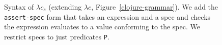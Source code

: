 \begin{figure}
\caption{Syntax of $\lambda c_s$ (extending $\lambda c$, Figure~\ref{clojure-grammar}).
  We add the \texttt{assert-spec} form that takes an expression and a spec
  and checks the expression evaluates to a value conforming to the spec.
  We restrict specs to just predicates \texttt{P}.}
  \label{clojurespec-grammar}
\end{figure}

